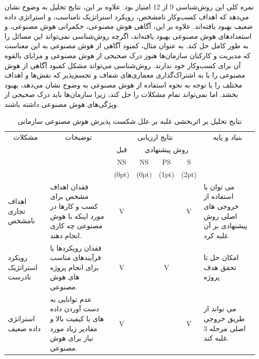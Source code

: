 \documentclass[a4paper,10pt]{article}
\begin{document}
            نمره کلی این روش‌شناسی 9 از 12 امتیاز بود. علاوه بر این، نتایج تحلیل به وضوح نشان می‌دهد که اهداف کسب‌وکار نامشخص، رویکرد استراتژیک نامناسب، و استراتژی داده ضعیف بهبود یافته‌اند. علاوه بر این، آگاهی هوش مصنوعی، حکمرانی هوش مصنوعی، و استعدادهای هوش مصنوعی بهبود یافته‌اند، اگرچه روش‌شناسی نمی‌تواند این مسائل را به طور کامل حل کند. به عنوان مثال، کمبود آگاهی از هوش مصنوعی به این معناست که مدیریت و کارکنان سازمان‌ها هنوز درک صحیحی از هوش مصنوعی و مزایای بالقوه آن برای کسب‌وکار خود ندارند. روش‌شناسی می‌تواند مشکل کمبود آگاهی از هوش مصنوعی را با به اشتراک‌گذاری معماری‌های شفاف و تجسم‌پذیر که نقش‌ها و اهداف مختلف را با توجه به نحوه استفاده از هوش مصنوعی به وضوح نشان می‌دهد، بهبود بخشد. اما نمی‌تواند تمام مشکلات را حل کند، زیرا سازمان‌ها باید درک صحیحی از ویژگی‌های هوش مصنوعی داشته باشند.

            \begin{table}
                        
                \centering
                \caption{نتایج تحلیل بر اثربخشی غلبه بر علل شکست پذیرش هوش مصنوعی سازمانی}
                \begin{tabularx}{\textwidth}{ p{1.5cm} p{6.5cm} c c c c p{5.5cm} }

                    \hline

                    \multicolumn{1}{c}{مشکلات} & \multicolumn{1}{c}{توضیحات} & \multicolumn{4}{c}{نتایج ارزیابی} & \multicolumn{1}{c}{بنیاد و پایه} \\
                    &  & قبل & \multicolumn{3}{c}{روش پیشنهادی} &  \\
                    &  & NS & NS & PS & S &  \\
                    &  & (0pt) & (0pt) & (1pt) & (2pt) &  \\

                    \hline

                    اهداف تجاری نامشخص & فقدان اهداف مشخص برای کسب و کارها در مورد اینکه با هوش مصنوعی چه کاری انجام دهند. & V &  &  & V & می توان با استفاده از خروجی های اصلی روش پیشنهادی بر آن غلبه کرد. \\

                    رویکرد استراتژیک نادرست & فقدان رویکردها یا فرآیندهای مناسب برای انجام پروژه های هوش مصنوعی. & V &  & V &  & امکان حل تا تحقق هدف پروژه \\

                    استراتژی داده ضعیف & عدم توانایی به دست آوردن داده های با کیفیت بالا و مقادیر زیاد مورد نیاز برای هوش مصنوعی. & V &  &  & V & می تواند از طریق خروجی اصلی مرحله 3 غلبه کند. \\


\end{tabularx}
\end{table}
\end{document}
